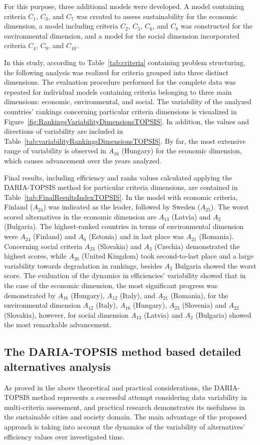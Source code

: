 \documentclass[final,5p,times,twocolumn,authoryear]{elsarticle}
\begin{document}
For this purpose, three additional models were developed. A model containing criteria $C_{1}$, $C_{3}$, and $C_{7}$ was created to assess sustainability for the economic dimension, a model including criteria $C_{2}$, $C_{5}$, $C_{6}$, and $C_{8}$ was constructed for the environmental dimension, and a model for the social dimension incorporated criteria $C_{4}$, $C_{9}$, and $C_{10}$.

In this study, according to Table~\ref{tab:criteria} containing problem structuring, the following analysis was realized for criteria grouped into three distinct dimensions. The evaluation procedure performed for the complete data was repeated for individual models containing criteria belonging to three main dimensions: economic, environmental, and social. The variability of the analyzed countries' rankings concerning particular criteria dimensions is visualized in Figure~\ref{fig:RankingsVariabilityDimensionsTOPSIS}. In addition, the values and directions of variability are included in Table~\ref{tab:variabilityRankingsDimensionsTOPSIS}. By far, the most extensive range of variability is observed in $A_{16}$ (Hungary) for the economic dimension, which causes advancement over the years analyzed. 

Final results, including efficiency and ranks values calculated applying the DARIA-TOPSIS method for particular criteria dimensions, are contained in Table~\ref{tab:FinalResultsIndexTOPSIS}. In the model with economic criteria, Finland ($A_{24}$) was indicated as the leader, followed by Sweden ($A_{25}$). The worst scored alternatives in the economic dimension are $A_{13}$ (Latvia) and $A_{2}$ (Bulgaria). The highest-ranked countries in terms of environmental dimension were $A_{24}$ (Finland) and $A_{6}$ (Estonia) and in last place was $A_{21}$ (Romania). Concerning social criteria
$A_{23}$ (Slovakia) and $A_{3}$ (Czechia) demonstrated the highest scores, while $A_{26}$ (United Kingdom) took second-to-last place and a large variability towards degradation in rankings, besides $A_{2}$ Bulgaria showed the worst score. The evaluation of the dynamics in efficiencies' variability showed that in the case of the economic dimension, the most significant progress was demonstrated by $A_{16}$ (Hungary), $A_{12}$ (Italy), and $A_{21}$ (Romania), for the environmental dimension $A_{12}$ (Italy), $A_{16}$ (Hungary), $A_{23}$ (Slovenia) and $A_{22}$ (Slovakia), however, for social dimension $A_{13}$ (Latvia) and $A_{2}$ (Bulgaria) showed the most remarkable advancement.

\subsection{The DARIA-TOPSIS method based detailed alternatives analysis}
\label{sec:resultsDiscussion}
As proved in the above theoretical and practical considerations, the DARIA-TOPSIS method represents a successful attempt considering data variability in multi-criteria assessment, and practical research demonstrates its usefulness in the sustainable cities and society domain. The main advantage of the proposed approach is taking into account the dynamics of the variability of alternatives' efficiency values over investigated time.
\end{document}
